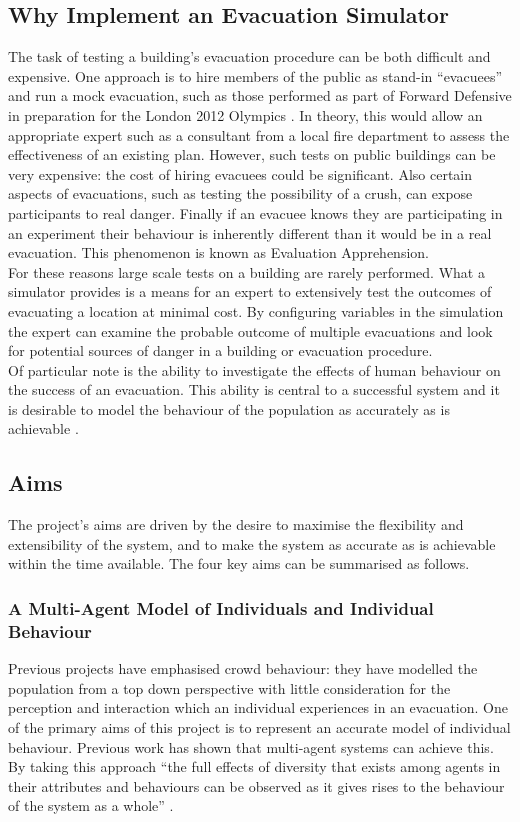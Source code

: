 \subsection{Why Implement an Evacuation Simulator}
The task of testing a building's evacuation procedure can be
both difficult and expensive. One approach is to hire members of the public
as stand-in ``evacuees'' and run a mock evacuation, such as those performed as part of Forward Defensive
in preparation for the London 2012 Olympics \cite{DailyMailEvacuation}. In theory, this would allow an 
appropriate expert such as a consultant from a local fire department to assess the effectiveness
of an existing plan. However, such tests on public buildings can be very expensive: the cost
of hiring evacuees could be significant. Also certain aspects of evacuations, such
as testing the possibility of a crush, can expose participants
to real danger. Finally if an evacuee knows they are participating in an experiment
their behaviour is inherently different than it would be in a real evacuation. This
phenomenon is known as Evaluation Apprehension\cite{EvalApprehension}.\\
For these reasons large scale tests on a building are rarely performed.
What a simulator provides is a means for an expert to extensively test the outcomes of evacuating a location
at minimal cost. By configuring variables in the simulation the expert can examine the probable outcome of multiple evacuations
and look for potential sources of danger in a building or evacuation procedure.\\

Of particular note is the ability to investigate the effects of human behaviour on the success of an evacuation. This ability is central to a successful system and it is desirable to model the behaviour of the population as accurately as is achievable \cite{psychology}.


\subsection{Aims}
The project's aims are driven by the desire to maximise the flexibility and extensibility of the system, and to make the system as accurate as is achievable within the time available. The four key aims can be summarised as follows.

\subsubsection{A Multi-Agent Model of Individuals and Individual Behaviour}
Previous projects have emphasised crowd behaviour: they have modelled the population from a top down 
perspective with little consideration for the perception and interaction which an individual experiences in an evacuation.
One of the primary aims of this project is to represent an accurate model of individual behaviour.
Previous work has shown that multi-agent systems can achieve this. By taking this approach ``the full effects of diversity that exists among agents in their attributes and behaviours can be observed as it
gives rises to the behaviour of the system as a whole'' \cite{AgentBasedTutorial}.

